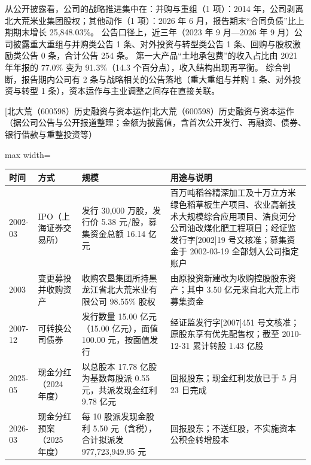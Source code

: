  从公开披露看，公司的战略推进集中在：并购与重组（1 项）：2014 年，公司剥离北大荒米业集团股权；其他动作（1 项）：2026 年 6 月，报告期末“合同负债”比上期期末增长 25,848.03\%。 公告口径上，近三年（2023 年 9 月---2026 年 9 月）公司披露重大重组与并购类公告 1 条、对外投资与转型类公告 1 条、回购与股权激励类公告 0 条，合计公告 254 条。 第一大产品“土地承包费”的收入占比由 2021 年年报的 77.0\% 变为 91.3\%（14.3 个百分点），收入结构出现再平衡。 综合判断，报告期内公司有 2 条与战略相关的公告落地（重大重组与并购 1 条、对外投资与转型 1 条），资本运作与主业调整之间存在直接关联。

\begin{center}\small\setlength{\tabcolsep}{4pt}
[北大荒（600598）历史融资与资本运作]{北大荒（600598）历史融资与资本运作（据公司公告与公开报道整理；金额为披露值，含首次公开发行、再融资、债券、银行借款与重整投资等）}
\begin{adjustbox}{max width=\textwidth}
\begin{tabular}{@{}p{1.45cm}p{2.55cm}p{4.05cm}p{4.95cm}@{}}
\toprule
时间 & 方式 & 规模 & 用途与说明 \\
\midrule
2002-03 & IPO（上海证券交易所） & 发行 30,\allowbreak{}000 万股，\allowbreak{}发行价 5.38 元/\allowbreak{}股，\allowbreak{}募集资金总额 16.14 亿元 & 百万吨稻谷精深加工及十万立方米绿色稻草板生产项目、\allowbreak{}农业高新技术大规模综合应用项目、\allowbreak{}浩良河分公司油改煤化肥工程项目；经证监发行字[2002]19 号文核准；募集资金于 2002-03-19 全部划入公司指定账户 \\
2003 & 变更募投并收购资产 & 收购农垦集团所持黑龙江省北大荒米业有限公司 98.55\% 股权 & 由原投资新建改为收购控股股东资产；其中 3.50 亿元来自北大荒上市募集资金 \\
2007-12 & 可转换公司债券 & 发行数量 15.00 亿元（15.00 亿元），\allowbreak{}面值 100.00 元，\allowbreak{}按面值发行 & 经证监发行字[2007]451 号文核准；原股东享有优先配售权；截至 2010-12-31 累计转股 1.43 亿股 \\
2025-05 & 现金分红（2024 年度） & 以总股本 17.78 亿股为基数每股派 0.55 元，\allowbreak{}共派发现金红利 9.78 亿元 & 回报股东；现金红利发放已于 5 月 23 日完成 \\
2026-03 & 现金分红预案（2025 年度） & 每 10 股派发现金股利 5.50 元（含税），\allowbreak{}合计拟派发 977,\allowbreak{}723,\allowbreak{}949.95 元 & 回报股东；不送红股，\allowbreak{}不实施资本公积金转增股本 \\
\bottomrule
\end{tabular}
\end{adjustbox}
\end{center}

